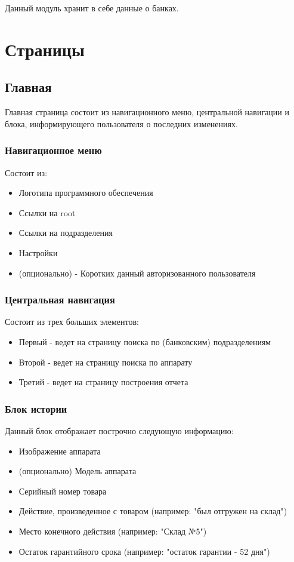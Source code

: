 \documentclass[DIV=calc, paper=a4, fontsize=11pt]{scrartcl} %
\begin{document}
Данный модуль хранит в себе данные о банках. 


\section{Страницы}

\subsection{Главная}

Главная страница состоит из навигационного меню, центральной навигации и блока, информирующего пользователя о последних изменениях.

\subsubsection{Навигационное меню}

Состоит из:
\begin{itemize}
	\item Логотипа программного обеспечения
	\item Ссылки на root
	\item Ссылки на подразделения
	\item Настройки
	\item (опционально) - Коротких данный авторизованного пользователя
\end{itemize}

\subsubsection{Центральная навигация}
Состоит из трех больших элементов:
\begin{itemize}
	\item Первый - ведет на страницу поиска по (банковским) подразделениям
	\item Второй - ведет на страницу поиска по аппарату
	\item Третий - ведет на страницу построения отчета
\end{itemize}

\subsubsection{Блок истории}
Данный блок отображает построчно следующую информацию:
\begin{itemize}
	\item Изображение аппарата
	\item (опционально) Модель аппарата
	\item Серийный номер товара
	\item Действие, произведенное с товаром (например: "был отгружен на склад")
	\item Место конечного действия (например: "Склад №5")
	\item Остаток гарантийного срока (например: "остаток гарантии - 52 дня")
\end{itemize}
\end{document}
